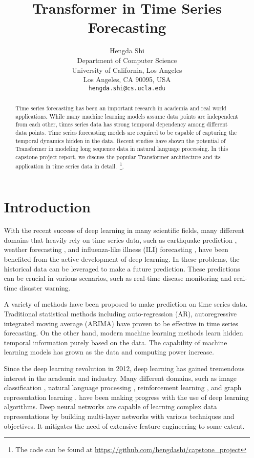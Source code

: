 \documentclass{article} %
\title{Transformer in Time Series Forecasting}
\author{Hengda Shi \\
Department of Computer Science \\
University of California, Los Angeles \\
Los Angeles, CA 90095, USA \\
\texttt{hengda.shi@cs.ucla.edu}
}
\begin{document}
\maketitle

\begin{abstract}
Time series forecasting has been an important research in academia and real world applications.
While many machine learning models assume data points are independent from each other, times series data has strong temporal dependency among different data points.
Time series forecasting models are required to be capable of capturing the temporal dynamics hidden in the data.
Recent studies have shown the potential of Transformer in modeling long sequence data in natural language processing.
In this capstone project report, we discuss the popular Transformer architecture and its application in time series data in detail.~\footnote{The code can be found at \href{https://github.com/hengdashi/capstone_project}{https://github.com/hengdashi/capstone\_project}}.
\end{abstract}


\section{Introduction}

With the recent success of deep learning in many scientific fields, many different domains that heavily rely on time series data, such as earthquake prediction \citep{Johnsone2011362118}, weather forecasting \citep{REN2021100178}, and influenza-like illness (ILI) forecasting \citep{wu2020deep}, have been benefited from the active development of deep learning.
In these problems, the historical data can be leveraged to make a future prediction.
These predictions can be crucial in various scenarios, such as real-time disease monitoring and real-time disaster warning.

A variety of methods have been proposed to make prediction on time series data.
Traditional statistical methods including auto-regression (AR), autoregressive integrated moving average (ARIMA) have proven to be effective in time series forecasting.
On the other hand, modern machine learning methods learn hidden temporal information purely based on the data.
The capability of machine learning models has grown as the data and computing power increase.

Since the deep learning revolution in 2012, deep learning has gained tremendous interest in the academia and industry.
Many different domains, such as image classification \citep{NIPS2012_c399862d}, natural language processing \citep{devlin-etal-2019-bert}, reinforcement learning \citep{alphago2016}, and graph representation learning \citep{Kipf:2016tc}, have been making progress with the use of deep learning algorithms.
Deep neural networks are capable of learning complex data representations by building multi-layer networks with various techniques and objectives.
It mitigates the need of extensive feature engineering to some extent.
\end{document}
